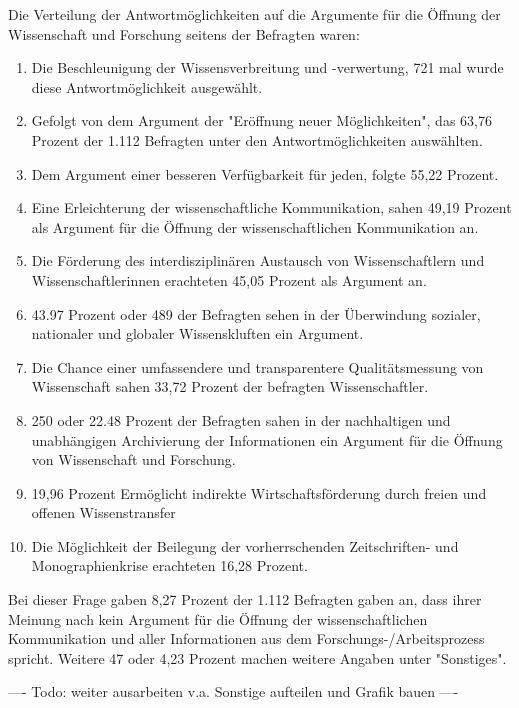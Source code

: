 Die Verteilung der Antwortmöglichkeiten auf die Argumente für die Öffnung der Wissenschaft und Forschung seitens der Befragten waren:
\begin{enumerate}
\item Die Beschleunigung der Wissensverbreitung und -verwertung, 721 mal wurde diese Antwortmöglichkeit ausgewählt.
\item Gefolgt von dem Argument der "Eröffnung neuer Möglichkeiten", das 63,76 Prozent der 1.112 Befragten unter den Antwortmöglichkeiten auswählten.
\item Dem Argument einer besseren Verfügbarkeit für jeden, folgte 55,22 Prozent.
\item Eine Erleichterung der wissenschaftliche Kommunikation, sahen 49,19 Prozent als Argument für die Öffnung der wissenschaftlichen Kommunikation an.
\item Die Förderung des interdisziplinären Austausch von Wissenschaftlern und Wissenschaftlerinnen erachteten 45,05 Prozent als Argument an.
\item 43.97 Prozent oder 489 der Befragten sehen in der Überwindung sozialer, nationaler und globaler Wissenskluften ein Argument.
\item Die Chance einer umfassendere und transparentere Qualitätsmessung von Wissenschaft sahen 33,72 Prozent der befragten Wissenschaftler.
\item 250 oder 22.48 Prozent der Befragten sahen in der nachhaltigen und unabhängigen Archivierung der Informationen ein Argument für die Öffnung von Wissenschaft und Forschung.
\item 19,96 Prozent Ermöglicht indirekte Wirtschaftsförderung durch freien und offenen Wissenstransfer
\item Die Möglichkeit der Beilegung der vorherrschenden Zeitschriften- und Monographienkrise erachteten 16,28 Prozent.
\end{enumerate}

Bei dieser Frage gaben 8,27 Prozent der 1.112 Befragten gaben an, dass ihrer Meinung nach kein Argument für die Öffnung der wissenschaftlichen Kommunikation und aller Informationen aus dem Forschungs-/Arbeitsprozess spricht. Weitere 47 oder 4,23 Prozent machen weitere Angaben unter "Sonstiges".

---- Todo: weiter ausarbeiten v.a. Sonstige aufteilen und Grafik bauen ----

